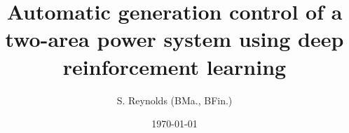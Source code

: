 \documentclass[12pt,oneside]{book}
\begin{document}
    \onehalfspace
  
    \title{Automatic generation control of a two-area power system using deep reinforcement learning} 
    \author{S. Reynolds (BMa., BFin.)}
    
    \date{\today} 
    
    
    
    

    \frontmatter
    \maketitle
    \declaration
    
    
    

    \cleardoublepage
     {} 
    \tableofcontents

	\cleardoublepage
	 \label{listoffigures}
	\listoffigures
	
	\cleardoublepage
	 \label{listoftables} 
	\listoftables

	

	
    \cleardoublepage
    \mainmatter
\end{document}
